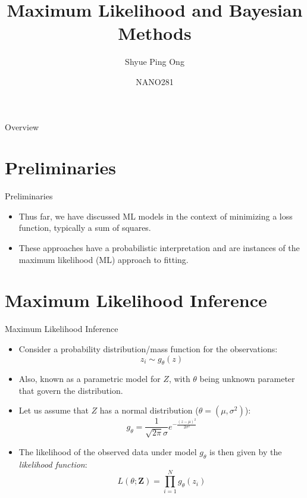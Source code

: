 \documentclass[aspectratio=169]{beamer}
\title[Maximum Likelihood and Bayesian Methods]{Maximum Likelihood and Bayesian Methods}
\author{Shyue Ping Ong}
\institute[UCSD]{University of California, San Diego\\
\medskip
}
\date{NANO281} %
\let \vec \mathbf
\begin{document}
\begin{frame}
    \titlepage %
\end{frame}


\begin{frame}{Overview}
    \tableofcontents
\end{frame}


\section{Preliminaries}

\begin{frame}{Preliminaries}
    \begin{itemize}
        \item Thus far, we have discussed ML models in the context of minimizing a loss function, typically a sum of squares.
        \item These approaches have a probabilistic interpretation and are instances of the maximum likelihood (ML) approach to fitting.
    \end{itemize}
\end{frame}

\section{Maximum Likelihood Inference}


\begin{frame}{Maximum Likelihood Inference}
    \begin{itemize}
        \item Consider a probability distribution/mass function for the observations:
        \begin{equation*}
            z_i \sim g_{\theta}(z)
        \end{equation*}
        \item Also, known as a parametric model for $Z$, with $\theta$ being unknown parameter that govern the distribution. 
        \item Let us assume that $Z$ has a normal distribution ($\theta = (\mu, \sigma^2)$):
        \begin{equation*}
            g_{\theta} = \frac{1}{\sqrt{2\pi}\sigma} e^{-\frac{(z-\mu)^2}{2\sigma^2}}
        \end{equation*}
        \item The likelihood of the observed data under model $g_{\theta}$ is then given by the \textit{likelihood function}:
        \begin{equation*}
            L(\theta; \vec{Z}) = \prod_{i=1}^N g_{\theta}(z_i)
        \end{equation*}
    \end{itemize}
\end{frame} 
\end{document}
